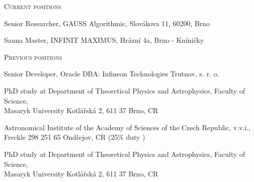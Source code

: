 \documentclass[10pt]{article}
\begin{document}
\begin{cv}




\begin{cvlist}{\large \textsc{Current positions}}
\item Senior Researcher, GAUSS Algorithmic, Slovákova 11, 60200, Brno
\item Sauna Master, INFINIT MAXIMUS, Hrázní 4a, Brno - Kníničky
\end{cvlist}


\begin{cvlist}{\large \textsc{Previous positions}}
\item Senior Developer, Oracle DBA: Infineon Technologies Trutnov, s. r. o.
\item PhD study at Department of Theoretical Physics and Astrophysics, Faculty of Science,\\ Masaryk University Kotl\'{a}\v{r}sk\'{a} 2, 611 37 Brno, CR
\item Astronomical Institute of the Academy of Sciences of the Czech
  Republic, v.v.i.,\\ Freckle 298 251 65 Ondřejov, CR (25\% duty )
\item PhD study at Department of Theoretical Physics and Astrophysics, Faculty of Science,\\ Masaryk University Kotl\'{a}\v{r}sk\'{a} 2, 611 37 Brno, CR
\end{cvlist}


\end{cv}
\end{document}
